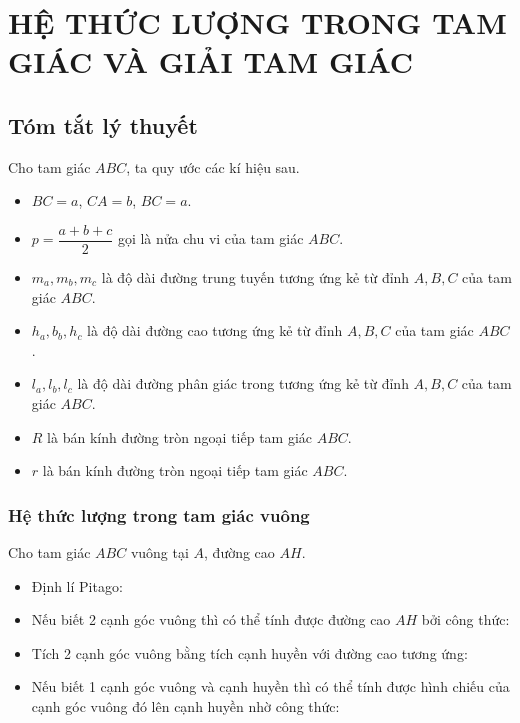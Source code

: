 \section{HỆ THỨC LƯỢNG TRONG TAM GIÁC VÀ GIẢI TAM GIÁC}
\subsection{Tóm tắt lý thuyết}
Cho tam giác $ABC$, ta quy ước các kí hiệu sau.
\begin{itemize}
	\item $BC=a$, $CA=b$, $BC=a$.
	\item $p=\dfrac{a+b+c}{2}$ gọi là nửa chu vi của tam giác $ABC$.
	\item $m_a, m_b, m_c$ là độ dài đường trung tuyến tương ứng kẻ từ đỉnh $A, B, C$ của tam giác $ABC$.
	\item $h_a, b_b, h_c$ là độ dài đường cao tương ứng kẻ từ đỉnh $A, B, C$ của tam giác $ABC$.
	\item $l_a, l_b, l_c$ là độ dài đường phân giác trong tương ứng kẻ từ đỉnh $A, B, C$ của tam giác $ABC$.
	\item $R$ là bán kính đường tròn ngoại tiếp tam giác $ABC$.
	\item $r$ là bán kính đường tròn ngoại tiếp tam giác $ABC$.
\end{itemize}
\subsubsection{Hệ thức lượng trong tam giác vuông}
Cho tam giác \(ABC\) vuông tại \(A\), đường cao \(AH\).
\begin{center}
\end{center}
\begin{itemize}
	\item Định lí Pitago:
	\begin{center}
	\end{center}
	\item Nếu biết 2 cạnh góc vuông thì có thể tính được đường cao \(AH\) bởi công thức:
	\begin{center}
	\end{center}
	\item Tích 2 cạnh góc vuông bằng tích cạnh huyền với đường cao tương ứng:
	\begin{center}
	\end{center}
	\item Nếu biết 1 cạnh góc vuông và cạnh huyền thì có thể tính được hình chiếu của cạnh góc vuông đó lên cạnh huyền nhờ công thức:
	\begin{center}
	\end{center}
\end{itemize}
